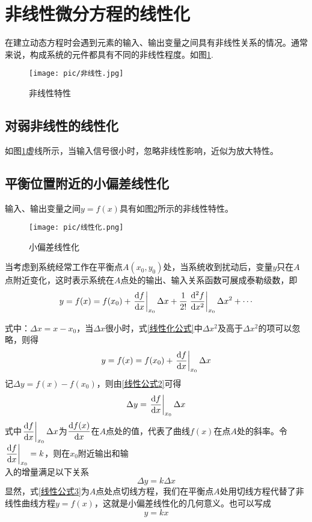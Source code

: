 \section{非线性微分方程的线性化}
在建立动态方程时会遇到元素的输入、输出变量之间具有非线性关系的情况。通常来说，构成系统的元件都具有不同的非线性程度。如图\ref{非线性}.
\begin{figure}[!htp]
	\centering
	\texttt{[image: pic/非线性.jpg]}
	\caption{非线性特性}
	\label{非线性}
\end{figure}

\subsection{对弱非线性的线性化}
如图\ref{非线性}虚线所示，当输入信号很小时，忽略非线性影响，近似为放大特性。

\subsection{平衡位置附近的小偏差线性化}
输入、输出变量之间$y=f(x)$具有如图\ref{小偏差线性化}所示的非线性特性。
\begin{figure}[!htp]
	\centering
	\texttt{[image: pic/线性化.png]}
	\caption{小偏差线性化}
	\label{小偏差线性化}
\end{figure}

当考虑到系统经常工作在平衡点$A(x_0,y_0)$处，当系统收到扰动后，变量$y$只在$A$点附近变化，这时表示系统在$A$点处的输出、输入关系函数可展成泰勒级数，即
\begin{equation}
	y = f(x) = f(x_0) + \left. \frac{\d f}{\d x} \right|_{x_0} \Delta x + \frac{1}{2!} \left. \frac{\d^2 f}{\d x^2}\right|_{x_0} \Delta x^2 + \cdots
	\label{线性化公式}
\end{equation}

式中：$\Delta x = x - x_0$，当$\Delta x$很小时，式\eqref{线性化公式}中$\Delta x^2$及高于$\Delta x^2$的项可以忽略，则得
\begin{equation}
	y=f(x)=f(x_0)+\left. \frac{{\rm{d}} f}{{\rm{d}} x}\right|_{x_0}\Delta x
	\label{线性公式2}
\end{equation}
记$\Delta y = f(x)- f(x_0)$，则由\eqref{线性公式2}可得
\begin{equation}
	\Delta y = \left. \frac{{\rm{d}} f}{{\rm{d}} x}\right|_{x_0}\Delta x
\end{equation}
式中$\displaystyle \left. \frac{{\rm{d}} f}{{\rm{d}} x}\right|_{x_0}\Delta x$为$\dfrac{{\rm{d}} f(x)}{{\rm{d}} x}$在$A$点处的值，代表了曲线$f(x)$在点$A$处的斜率。令$\left. \dfrac{{\rm{d}} f}{{\rm{d}} x}\right|_{x_0} = k$，则在$x_0$附近输出和输\\[0.3em]
入的增量满足以下关系
\begin{equation}
	\Delta y = k \Delta x
	\label{线性公式3}
\end{equation}
显然，式\eqref{线性公式3}为$A$点处点切线方程，我们在平衡点$A$处用切线方程代替了非线性曲线方程$y=f(x)$，这就是小偏差线性化的几何意义。也可以写成
\begin{equation}
	y = kx
\end{equation}

